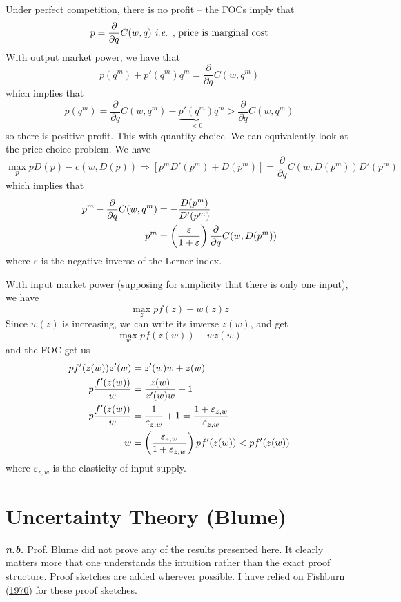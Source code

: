 \documentclass[12pt]{article}
\begin{document}
Under perfect competition, there is no profit -- the FOCs imply that
\[
p = \frac{\partial }{\partial q} C(w,q) \text{ \emph{i.e.} , price is marginal cost}
\]
With output market power, we have that
\[
p(q^m) + p'(q^m)q^m = \frac{\partial }{\partial q} C(w,q^m)
\]
which implies that
\[
p(q^m) = \frac{\partial }{\partial q} C(w,q^m) - \underbrace{p'(q^m)}_{<0}q^m > \frac{\partial}{\partial q} C(w,q^m)
\]
so there is positive profit. This with quantity choice. We can equivalently look at the price choice problem. We have
\[
\max_p p D(p) - c(w,D(p)) \Longrightarrow [p^m D'(p^m) + D(p^m)] = \frac{\partial}{\partial q} C(w,D(p^m)) D'(p^m)
\]
which implies that
\begin{align*}
	p^m - \frac{\partial}{\partial q}C(w,q^m) &= -\frac{D(p^m)}{D'(p^m)} \\
	p^m &= \left( \frac{\varepsilon}{1 + \varepsilon}\right) \frac{\partial}{\partial q} C(w,D(p^m))
\end{align*}
where $\varepsilon$ is the negative inverse of the Lerner index.

With input market power (supposing for simplicity that there is only one input), we have
\[
\max_z pf(z) - w(z)z
\]
Since $w(z)$ is increasing, we can write its inverse $z(w)$, and get
\[
\max_w pf(z(w)) - w z(w)
\]
and the FOC get us
\begin{align*}
	p f'(z(w)) z'(w) &= z'(w) w  + z(w) \\
	p \frac{f'(z(w))}{w} &= \frac{z(w)}{z'(w)w} + 1 \\
	p \frac{f'(z(w))}{w} &= \frac{1}{\varepsilon_{z,w}} + 1 = \frac{1 + \varepsilon_{z,w}}{\varepsilon_{z,w}} \\
	w &= \left( \frac{\varepsilon_{z,w}}{1 + \varepsilon_{z,w}} \right) p f'(z(w)) < p f'(z(w))
\end{align*}
where $\varepsilon_{z,w}$ is the elasticity of input supply.

\newpage
\section{Uncertainty Theory (Blume)}\label{sec:blume}

\textbf{\emph{n.b.}} Prof. Blume did not prove any of the results presented here. It clearly matters more that one understands the intuition rather than the exact proof structure. Proof sketches are added wherever possible. I have relied on \href{https://www.semanticscholar.org/paper/Utility-theory-for-decision-making-Fishburn/905a24a912171436e0abd3b5f1fdcb963e6f852f}{Fishburn (1970)} for these proof sketches.
\end{document}
